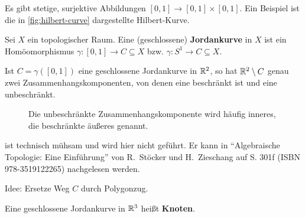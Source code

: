 \begin{beispiel}%
    Es gibt stetige, surjektive Abbildungen 
    $[0,1] \rightarrow [0,1] \times [0,1]$. Ein Beispiel ist die
    in \cref{fig:hilbert-curve} dargestellte Hilbert-Kurve.

    
\end{beispiel}

\begin{definition}%
    Sei $X$ ein topologischer Raum. Eine (geschlossene)
    \textbf{Jordankurve} in $X$ ist ein Homöomorphismus 
    $\gamma: [0,1] \rightarrow C \subseteq X$ bzw.
    $\gamma: S^1 \rightarrow C \subseteq X$.
\end{definition}

\begin{satz}
    Ist $C=\gamma([0,1])$ eine geschlossene Jordankurve in $\mathbb{R}^2$,
    so hat $\mathbb{R}^2 \setminus C$ genau zwei Zusammenhangskomponenten,
    von denen eine beschränkt ist und eine unbeschränkt.
\end{satz}

\begin{figure}[htp]
    \centering
     
    \label{fig:jordan-kurvensatz}
    \caption{Die unbeschränkte Zusammenhangskomponente wird häufig inneres, die beschränkte äußeres genannt.}
\end{figure}

\begin{beweis}
    ist technisch mühsam und wird hier nicht geführt. Er kann
    in \enquote{Algebraische Topologie: Eine Einführung} von R.~Stöcker
    und H.~Zieschang auf S. 301f (ISBN 978-3519122265) nachgelesen werden.

    Idee: Ersetze Weg $C$ durch Polygonzug.
\end{beweis}

\begin{definition}%
    Eine geschlossene Jordankurve in $\mathbb{R}^3$ heißt \textbf{Knoten}.
\end{definition}

